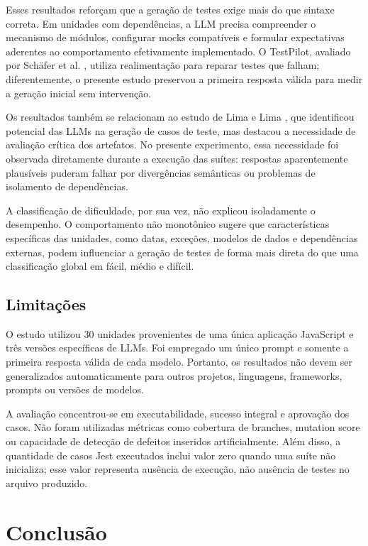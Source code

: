 \documentclass[12pt]{article}
\begin{document}
Esses resultados reforçam que a geração de testes exige mais do que sintaxe correta. Em unidades com dependências, a LLM precisa compreender o mecanismo de módulos, configurar mocks compatíveis e formular expectativas aderentes ao comportamento efetivamente implementado. O TestPilot, avaliado por Schäfer et al. \cite{schaefer2024testpilot}, utiliza realimentação para reparar testes que falham; diferentemente, o presente estudo preservou a primeira resposta válida para medir a geração inicial sem intervenção.

Os resultados também se relacionam ao estudo de Lima e Lima \cite{lima2026llms}, que identificou potencial das LLMs na geração de casos de teste, mas destacou a necessidade de avaliação crítica dos artefatos. No presente experimento, essa necessidade foi observada diretamente durante a execução das suítes: respostas aparentemente plausíveis puderam falhar por divergências semânticas ou problemas de isolamento de dependências.

A classificação de dificuldade, por sua vez, não explicou isoladamente o desempenho. O comportamento não monotônico sugere que características específicas das unidades, como datas, exceções, modelos de dados e dependências externas, podem influenciar a geração de testes de forma mais direta do que uma classificação global em fácil, médio e difícil.

\subsection{Limitações}

O estudo utilizou 30 unidades provenientes de uma única aplicação JavaScript e três versões específicas de LLMs. Foi empregado um único prompt e somente a primeira resposta válida de cada modelo. Portanto, os resultados não devem ser generalizados automaticamente para outros projetos, linguagens, frameworks, prompts ou versões de modelos.

A avaliação concentrou-se em executabilidade, sucesso integral e aprovação dos casos. Não foram utilizadas métricas como cobertura de branches, mutation score ou capacidade de detecção de defeitos inseridos artificialmente. Além disso, a quantidade de casos Jest executados inclui valor zero quando uma suíte não inicializa; esse valor representa ausência de execução, não ausência de testes no arquivo produzido.

\section{Conclusão}
\end{document}
